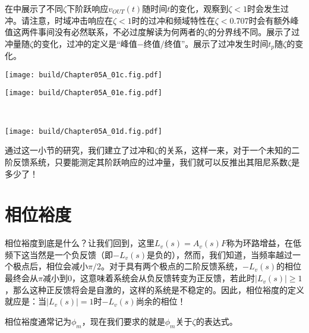 在中展示了不同$\zeta$下阶跃响应$v_{OUT}(t)$随时间$t$的变化，观察到$\zeta<1$时会发生过冲。请注意，时域冲击响应在$\zeta<1$时的过冲和频域特性在$\zeta<0.707$时会有额外峰值这两件事间没有必然联系，不必过度解读为何两者的$\zeta$的分界线不同。展示了过冲量随$\zeta$的变化，过冲的定义是“峰值$-$终值$/$终值”。展示了过冲发生时间$t_p$随$\zeta$的变化。
\begin{Figure}[二阶反馈系统的时域特性]
    \begin{FigureSub}
        \texttt{[image: build/Chapter05A\_01c.fig.pdf]}
    \end{FigureSub}
    \begin{FigureSub}
        \texttt{[image: build/Chapter05A\_01e.fig.pdf]}
    \end{FigureSub}\\ \vspace{0.25cm}
    \begin{FigureSub}
        \texttt{[image: build/Chapter05A\_01d.fig.pdf]}
    \end{FigureSub}
\end{Figure}
通过这一小节的研究，我们建立了过冲和$\zeta$的关系，这样一来，对于一个未知的二阶反馈系统，只要能测定其阶跃响应的过冲量，我们就可以反推出其阻尼系数$\zeta$是多少了！

\section{相位裕度}
相位裕度到底是什么？让我们回到，这里$L_v(s)=A_v(s)F$称为环路增益，在低频下这当然是一个负反馈（即$-L_v(s)$是负的），然而，我们知道，当频率越过一个极点后，相位会减小$\pi/2$。对于具有两个极点的二阶反馈系统，$-L_v(s)$的相位最终会从$\pi$减小到$0$，这意味着系统会从负反馈转变为正反馈，若此时$|L_v(s)|\geq 1$，那么这种正反馈将会是自激的，这样的系统是不稳定的。因此，相位裕度的定义就应是：当$|L_v(s)|=1$时$-L_v(s)$尚余的相位！

相位裕度通常记为$\phi_m$，现在我们要求的就是$\phi_m$关于$\zeta$的表达式。

